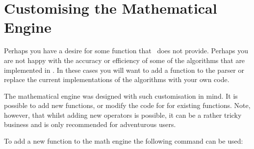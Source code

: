 %
%
%


\section{Customising the Mathematical Engine}

\label{pgfmath-reimplement}


Perhaps you have a desire for some function that \pgfname\ does not 
provide. Perhaps you are not happy with the accuracy or efficiency of 
some of the algorithms that are implemented in \pgfname. In these 
cases you will want to add a function to the parser or replace the 
current implementations of the algorithms with your own code.

The mathematical engine was designed with such customisation in mind.
It is possible to add new functions, or modify the code for for 
existing functions. Note, however, that whilst adding new operators 
is possible, it can be a rather tricky business and is only 
recommended for adventurous users.

To add a new function to the math engine the following command can be
used:

